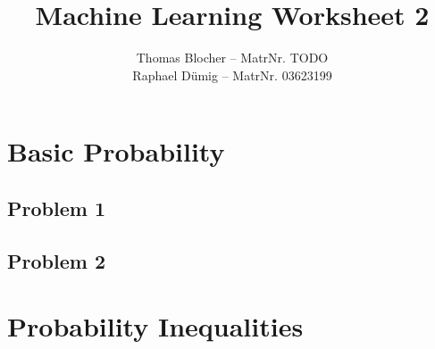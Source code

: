\documentclass{scrartcl}
\title{Machine Learning Worksheet 2}
\author{Thomas Blocher -- MatrNr. TODO \\ Raphael D\"umig -- MatrNr. 03623199}
\begin{document}
\maketitle

\section{Basic Probability}
\subsection*{Problem 1}


\subsection*{Problem 2}


\section{Probability Inequalities}
\end{document}

